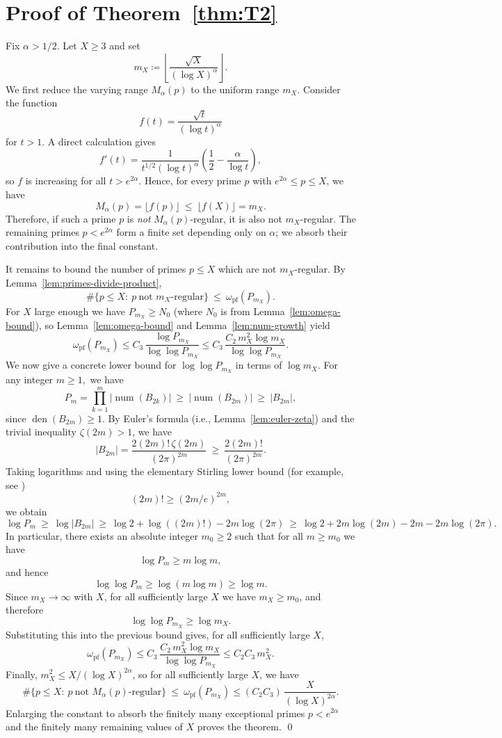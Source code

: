 \documentclass[12pt]{amsart}
\theoremstyle{plain}
\theoremstyle{definition}
\DeclareMathOperator{\num}{num}
\DeclareMathOperator{\den}{den}
\newcommand{\omegapf}{\omega_{\mathrm{pf}}} %
\begin{document}
\section{Proof of Theorem~\ref{thm:T2}}\label{Section3}
Fix $\alpha>1/2$.
Let $X\ge 3$ and set
\[
m_X \coloneq \left\lfloor \frac{\sqrt{X}}{(\log X)^{\alpha}}\right\rfloor.
\]
We first reduce the varying range $M_{\alpha}(p)$ to the uniform range $m_X$.
Consider the function
\[ f(t)=\frac{\sqrt{t}}{(\log t)^{\alpha}} \]
for $t>1$.
A direct calculation gives
\[
f'(t)=\frac{1}{t^{1/2}(\log t)^{\alpha}}\left(\frac12-\frac{\alpha}{\log t}\right),
\]
so $f$ is increasing for all $t>e^{2\alpha}$.
Hence, for every prime $p$ with $e^{2\alpha}\le p\le X$, we have
\[
M_{\alpha}(p)=\lfloor f(p)\rfloor\ \le\ \lfloor f(X)\rfloor = m_X.
\]
Therefore, if such a prime $p$ is \emph{not} $M_{\alpha}(p)$-regular, it is also not
$m_X$-regular.
The remaining primes $p<e^{2\alpha}$ form a finite set depending only on $\alpha$; we absorb
their contribution into the final constant.

It remains to bound the number of primes $p\le X$ which are not $m_X$-regular.
By Lemma~\ref{lem:primes-divide-product},
\[
\#\{p\le X:\ p\ \text{not $m_X$-regular}\}\ \le\ \omegapf(P_{m_X}).
\]
For $X$ large enough we have $P_{m_X}\ge N_0$ (where $N_0$ is from Lemma~\ref{lem:omega-bound}),
so Lemma~\ref{lem:omega-bound} and Lemma~\ref{lem:num-growth} yield
\[
\omegapf(P_{m_X})
\le C_3\,\frac{\log P_{m_X}}{\log\log P_{m_X}}
\le C_3\,\frac{C_2\,m_X^2\log m_X}{\log\log P_{m_X}}.
\]
We now give a concrete lower bound for $\log\log P_{m_X}$ in terms of $\log m_X$.
For any integer $m\ge 1,$ we have
\[
P_m=\prod_{k=1}^m |\num(B_{2k})|\ \ge\ |\num(B_{2m})|\ \ge\ |B_{2m}|,
\]
since $\den(B_{2m})\ge 1$.
By Euler's formula (i.e., Lemma~\ref{lem:euler-zeta}) and the trivial inequality $\zeta(2m)>1$, we have
\[
|B_{2m}|=\frac{2(2m)!\,\zeta(2m)}{(2\pi)^{2m}}
\ \ge\ \frac{2(2m)!}{(2\pi)^{2m}}.
\]
Taking logarithms and using the elementary Stirling lower bound (for example, see \cite{Robbins})
\[ (2m)!\ge (2m/e)^{2m}, \]
we obtain
\[
\log P_m\ \ge\ \log|B_{2m}|
\ \ge\ \log 2 + \log((2m)!) - 2m\log(2\pi)
\ \ge\ \log 2 + 2m\log(2m) - 2m - 2m\log(2\pi).
\]
In particular, there exists an absolute integer $m_0\ge 2$ such that for all $m\ge m_0$ we have
\[
\log P_m \ge m\log m,
\]
and hence
\[
\log\log P_m \ge \log(m\log m)\ge \log m.
\]
Since $m_X\to\infty$ with $X$, for all sufficiently large $X$ we have $m_X\ge m_0$, and therefore
\[
\log\log P_{m_X}\ge \log m_X.
\]
Substituting this into the previous bound gives, for all sufficiently large $X$,
\[
\omegapf(P_{m_X})
\le C_3\,\frac{C_2\,m_X^2\log m_X}{\log\log P_{m_X}}
\le C_2C_3\,m_X^2.
\]
Finally, $m_X^2\le X/(\log X)^{2\alpha}$, so for all sufficiently large $X$, we have
\[
\#\{p\le X:\ p\ \text{not $M_{\alpha}(p)$-regular}\}\ \le\ \omegapf(P_{m_X})
\le (C_2C_3)\,\frac{X}{(\log X)^{2\alpha}}.
\]
Enlarging the constant to absorb the finitely many exceptional primes $p<e^{2\alpha}$ and the finitely many
remaining values of $X$ proves the theorem.
\qed
\end{document}
